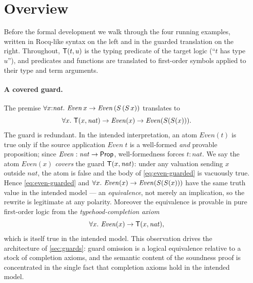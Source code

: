 \section{Overview}
\label{sec:overview}

Before the formal development we walk through the four running examples,
written in Rocq-like syntax on the left and in the guarded translation on the
right.  Throughout, $\mathsf{T}(t,u)$ is the typing predicate of the target logic
(``$t$ has type $u$''), and predicates and functions are translated to
first-order symbols applied to their type and term arguments.

\paragraph{A covered guard.}
The premise $\forall x{:}\mathit{nat}.\ \mathit{Even}\,x \imp
\mathit{Even}\,(S\,(S\,x))$ translates to
\begin{equation}
  \label{eq:even-guarded}
  \forall x.\ \mathsf{T}(x,\mathit{nat}) \rightarrow \mathit{Even}(x) \rightarrow
  \mathit{Even}(S(S(x))).
\end{equation}
The guard is redundant.  In the intended interpretation, an atom
$\mathit{Even}(t)$ is true only if the source application
$\mathit{Even}\;t$ is a well-formed \emph{and} provable proposition; since
$\mathit{Even} : \mathit{nat} \rightarrow \mathsf{Prop}$, well-formedness forces
$t : \mathit{nat}$.  We say the atom $\mathit{Even}(x)$ \emph{covers} the
guard $\mathsf{T}(x,\mathit{nat})$: under any valuation sending $x$ outside
$\mathit{nat}$, the atom is false and the body of \eqref{eq:even-guarded} is
vacuously true.  Hence \eqref{eq:even-guarded} and
$\forall x.\ \mathit{Even}(x) \rightarrow \mathit{Even}(S(S(x)))$ have the same
truth value in the intended model --- an \emph{equivalence}, not merely an
implication, so the rewrite is legitimate at any polarity.  Moreover the
equivalence is provable in pure first-order logic from the
\emph{typehood-completion axiom}
\[
  \forall x.\ \mathit{Even}(x) \rightarrow \mathsf{T}(x,\mathit{nat}),
\]
which is itself true in the intended model.  This observation drives the
architecture of \cref{sec:guards}: guard omission is a logical equivalence
relative to a stock of completion axioms, and the semantic content of the
soundness proof is concentrated in the single fact that completion axioms
hold in the intended model.

